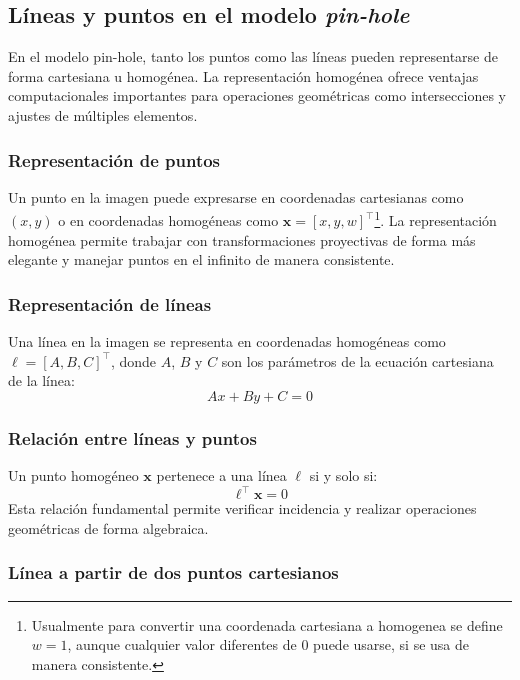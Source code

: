 \subsection{Líneas y puntos en el modelo \emph{pin-hole}}\label{subsec:lines-points}

En el modelo pin-hole, tanto los puntos como las líneas pueden representarse de forma cartesiana u homogénea. La representación homogénea ofrece ventajas computacionales importantes para operaciones geométricas como intersecciones y ajustes de múltiples elementos.

\subsubsection{Representación de puntos}
Un punto en la imagen puede expresarse en coordenadas cartesianas como $(x,y)$ o en coordenadas homogéneas como $\mathbf{x}=[x,y,w]^\top$\footnote{Usualmente para convertir una coordenada cartesiana a homogenea se define $w=1$, aunque cualquier valor diferentes de $0$ puede usarse, si se usa de manera consistente.}. La representación homogénea permite trabajar con transformaciones proyectivas de forma más elegante y manejar puntos en el infinito de manera consistente.

\subsubsection{Representación de líneas}

Una línea en la imagen se representa en coordenadas homogéneas como $\ell=[A,B,C]^\top$, donde $A$, $B$ y $C$ son los parámetros de la ecuación cartesiana de la línea:
\begin{equation}
	Ax + By + C = 0
\end{equation}

\subsubsection{Relación entre líneas y puntos}
Un punto homogéneo $\mathbf{x}$ pertenece a una línea $\ell$ si y solo si:
\begin{equation}
	\ell^\top\mathbf{x} = 0
\end{equation}
Esta relación fundamental permite verificar incidencia y realizar operaciones geométricas de forma algebraica.

\subsubsection{Línea a partir de dos puntos cartesianos}\label{subsec:line-from-points}

